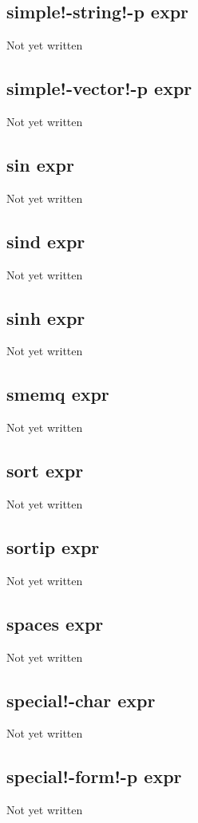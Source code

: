\documentclass[a4paper,11pt]{article}
\begin{document}
\subsection{\ttfamily simple!-string!-p expr}
Not yet written

\subsection{\ttfamily simple!-vector!-p expr}
Not yet written

\subsection{\ttfamily sin expr}
Not yet written

\subsection{\ttfamily sind expr}
Not yet written

\subsection{\ttfamily sinh expr}
Not yet written

\subsection{\ttfamily smemq expr}
Not yet written

\subsection{\ttfamily sort expr}
Not yet written

\subsection{\ttfamily sortip expr}
Not yet written

\subsection{\ttfamily spaces expr}
Not yet written

\subsection{\ttfamily special!-char expr}
Not yet written

\subsection{\ttfamily special!-form!-p expr}
Not yet written
\end{document}
